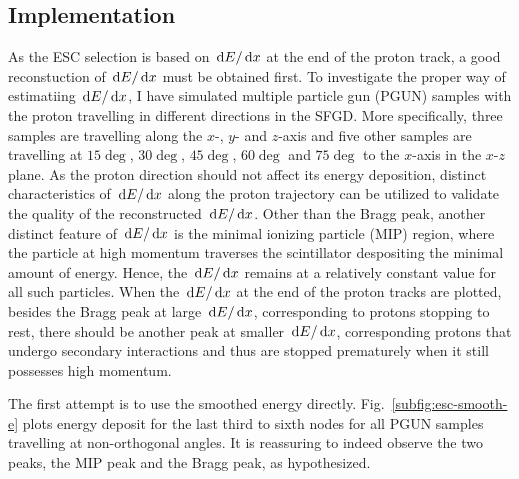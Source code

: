   \subsection{Implementation}
   \label{sec:sel-esc-imp}
   As the ESC selection is based on $\,\textrm{d}E/\,\textrm{d}x$ at the end of the proton track, a good reconstuction of $\,\textrm{d}E/\,\textrm{d}x$ must be obtained first.
   To investigate the proper way of estimatiing $\,\textrm{d}E/\,\textrm{d}x$, I have simulated multiple particle gun (PGUN) samples with the proton travelling in different directions in the SFGD.
   More specifically, three samples are travelling along the $x$-, $y$- and $z$-axis and five other samples are travelling at $15\deg$, $30\deg$, $45\deg$, $60\deg$ and $75\deg$ to the $x$-axis in the $x$-$z$ plane.
   As the proton direction should not affect its energy deposition, distinct characteristics of $\,\textrm{d}E/\,\textrm{d}x$ along the proton trajectory can be utilized to validate the quality of the reconstructed $\,\textrm{d}E/\,\textrm{d}x$.
   Other than the Bragg peak, another distinct feature of $\,\textrm{d}E/\,\textrm{d}x$ is the minimal ionizing particle (MIP) region, where the particle at high momentum traverses the scintillator despositing the minimal amount of energy. 
   Hence, the $\,\textrm{d}E/\,\textrm{d}x$ remains at a relatively constant value for all such particles.
   When the $\,\textrm{d}E/\,\textrm{d}x$ at the end of the proton tracks are plotted, besides the Bragg peak at large $\,\textrm{d}E/\,\textrm{d}x$, corresponding to protons stopping to rest, there should be another peak at smaller $\,\textrm{d}E/\,\textrm{d}x$, corresponding protons that undergo secondary interactions and thus are stopped prematurely when it still possesses high momentum.

   The first attempt is to use the smoothed energy directly. 
   Fig.~\ref{subfig:esc-smooth-e} plots energy deposit for the last third to sixth nodes for all PGUN samples travelling at non-orthogonal angles.
   It is reassuring to indeed observe the two peaks, the MIP peak and the Bragg peak, as hypothesized. 

